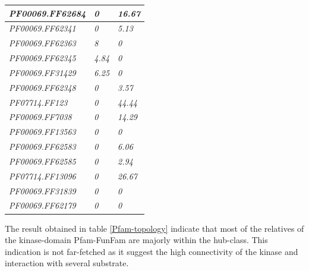 \documentclass[a4paper, 11pt]{article}
\begin{document}
\begin{table}[H]
\begin{tabular}{|l|l|l|}
\textit{PF00069.FF62684} & \textit{0}                & \textit{16.67}     \\ \hline
\textit{PF00069.FF62341} & \textit{0}                & \textit{5.13}      \\ \hline
\textit{PF00069.FF62363} & \textit{8}                & \textit{0}         \\ \hline
\textit{PF00069.FF62345} & \textit{4.84}             & \textit{0}         \\ \hline
\textit{PF00069.FF31429} & \textit{6.25}             & \textit{0}         \\ \hline
\textit{PF00069.FF62348} & \textit{0}                & \textit{3.57}      \\ \hline
\textit{PF07714.FF123}   & \textit{0}                & \textit{44.44}     \\ \hline
\textit{PF00069.FF7038}  & \textit{0}                & \textit{14.29}     \\ \hline
\textit{PF00069.FF13563} & \textit{0}                & \textit{0}         \\ \hline
\textit{PF00069.FF62583} & \textit{0}                & \textit{6.06}      \\ \hline
\textit{PF00069.FF62585} & \textit{0}                & \textit{2.94}      \\ \hline
\textit{PF07714.FF13096} & \textit{0}                & \textit{26.67}     \\ \hline
\textit{PF00069.FF31839} & \textit{0}                & \textit{0}         \\ \hline
\textit{PF00069.FF62179} & \textit{0}                & \textit{0}         \\ \hline
\end{tabular}
\end{table}

The result obtained in table \ref{Pfam-topology} indicate that most of the relatives of the kinase-domain Pfam-FunFam are majorly within the hub-class. This indication is not far-fetched as it suggest the high connectivity of the kinase and interaction with several substrate.
\end{document}
